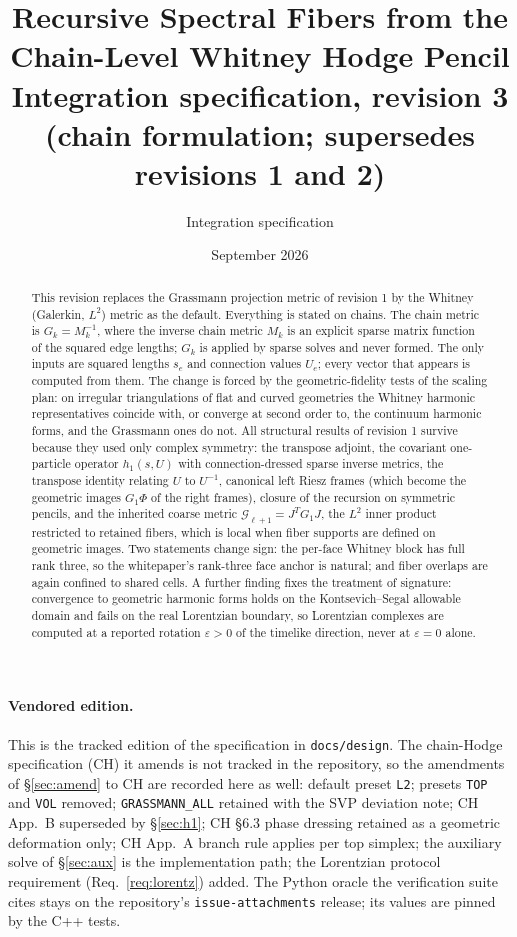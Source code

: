 \documentclass[11pt]{article}
\title{Recursive Spectral Fibers from the Chain-Level Whitney Hodge Pencil\\[6pt]
\large Integration specification, revision 3 (chain formulation; supersedes revisions 1 and 2)}
\author{Integration specification}
\date{September 2026}
\theoremstyle{definition}
\theoremstyle{plain}
\theoremstyle{remark}
\newcommand{\Tr}{^{T}}
\newcommand{\ttt}[1]{\texttt{#1}}
\begin{document}
\maketitle

\begin{abstract}
This revision replaces the Grassmann projection metric of revision 1 by the Whitney (Galerkin, \(L^{2}\)) metric as the default. Everything is stated on chains. The chain metric is \(G_k=M_k^{-1}\), where the inverse chain metric \(M_k\) is an explicit sparse matrix function of the squared edge lengths; \(G_k\) is applied by sparse solves and never formed. The only inputs are squared lengths \(s_e\) and connection values \(U_e\); every vector that appears is computed from them. The change is forced by the geometric-fidelity tests of the scaling plan: on irregular triangulations of flat and curved geometries the Whitney harmonic representatives coincide with, or converge at second order to, the continuum harmonic forms, and the Grassmann ones do not. All structural results of revision 1 survive because they used only complex symmetry: the transpose adjoint, the covariant one-particle operator \(h_1(s,U)\) with connection-dressed sparse inverse metrics, the transpose identity relating \(U\) to \(U^{-1}\), canonical left Riesz frames (which become the geometric images \(G_1\Phi\) of the right frames), closure of the recursion on symmetric pencils, and the inherited coarse metric \(\mathcal G_{\ell+1}=J\Tr G_1J\), the \(L^{2}\) inner product restricted to retained fibers, which is local when fiber supports are defined on geometric images. Two statements change sign: the per-face Whitney block has full rank three, so the whitepaper's rank-three face anchor is natural; and fiber overlaps are again confined to shared cells. A further finding fixes the treatment of signature: convergence to geometric harmonic forms holds on the Kontsevich--Segal allowable domain and fails on the real Lorentzian boundary, so Lorentzian complexes are computed at a reported rotation \(\varepsilon>0\) of the timelike direction, never at \(\varepsilon=0\) alone.
\end{abstract}

\paragraph*{Vendored edition.} This is the tracked edition of the specification in \texttt{docs/design}. The chain-Hodge specification (CH) it amends is not tracked in the repository, so the amendments of \S\ref{sec:amend} to CH are recorded here as well: default preset \ttt{L2}; presets \ttt{TOP} and \ttt{VOL} removed; \ttt{GRASSMANN\_ALL} retained with the SVP deviation note; CH App.~B superseded by \S\ref{sec:h1}; CH \S6.3 phase dressing retained as a geometric deformation only; CH App.~A branch rule applies per top simplex; the auxiliary solve of \S\ref{sec:aux} is the implementation path; the Lorentzian protocol requirement (Req.~\ref{req:lorentz}) added. The Python oracle the verification suite cites stays on the repository's \texttt{issue-attachments} release; its values are pinned by the C++ tests.
\end{document}
